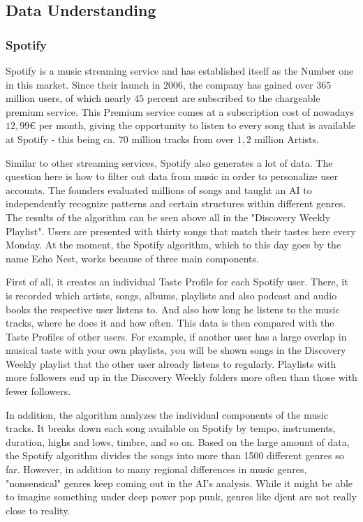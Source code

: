 \subsection{Data Understanding}

\subsubsection{Spotify}
Spotify is a music streaming service and has established itself as the Number one in this market. 
Since their launch in 2006, the company has gained over \(365\) million users, of which nearly \(45\) percent
are subscribed to the chargeable premium service. 
This Premium service comes at a subscription cost of nowadays \(12,99\)€ per month,
giving the opportunity to listen to every song that is available at Spotify - this being
ca. \(70\) million tracks from over \(1,2\) million Artists.

Similar to other streaming services, Spotify also generates a lot of data.
The question here is how to filter out data from music in order to personalize user accounts. 
The founders evaluated millions of songs and taught an AI to independently recognize
patterns and certain structures within different genres. 
The results of the algorithm can be seen above all in the "Discovery Weekly Playlist". 
Users are presented with thirty songs that match their tastes here every Monday.
At the moment, the Spotify algorithm, which to this day goes by the name Echo Nest,
works because of three main components. 

First of all, it creates an individual Taste Profile for each Spotify user. 
There, it is recorded which artists, songs, albums, playlists and also podcast and audio books the
respective user listens to. 
And also how long he listens to the music tracks, where he does it and how often.
This data is then compared with the Taste Profiles of other users. 
For example, if another user has a large overlap in musical taste with your own playlists,
you will be shown songs in the Discovery Weekly playlist that the other user already listens to regularly.
Playlists with more followers end up in the Discovery Weekly folders more often than those with
fewer followers. 

In addition, the algorithm analyzes the individual components of the music tracks. 
It breaks down each song available on Spotify by tempo, instruments, duration, highs and lows,
timbre, and so on. 
Based on the large amount of data, the Spotify algorithm divides the songs into more than 1500
different genres so far. 
However, in addition to many regional differences in music genres, "nonsensical" genres keep
coming out in the AI's analysis. While it might be able to imagine something under deep power pop punk,
genres like djent are not really close to reality. 

